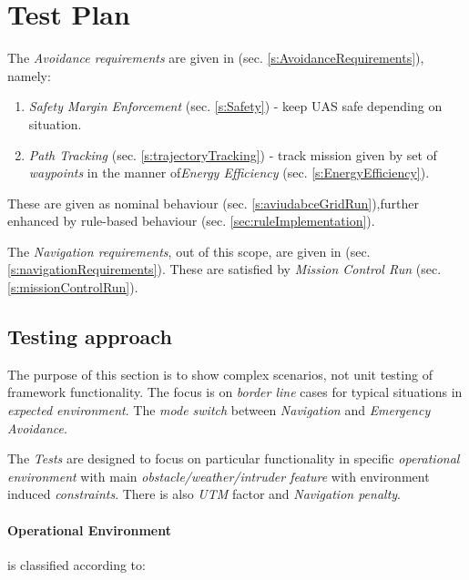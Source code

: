 \section{Test Plan} \label{s:testPlan}

\noindent The \emph{Avoidance requirements} are given in (sec. \ref{s:AvoidanceRequirements}), namely:
\begin{enumerate}
    \item\emph{Safety Margin Enforcement} (sec. \ref{s:Safety}) - keep UAS safe depending on situation.
    \item\emph{Path Tracking} (sec. \ref{s:trajectoryTracking}) - track mission given by set of \emph{waypoints} in the manner of\emph{Energy Efficiency} (sec. \ref{s:EnergyEfficiency}).
\end{enumerate}

These are given as nominal behaviour (sec. \ref{s:aviudabceGridRun}),further enhanced by rule-based behaviour (sec. \ref{sec:ruleImplementation}).

The \emph{Navigation requirements}, out of this scope, are given in (sec. \ref{s:navigationRequirements}). These are satisfied by \emph{Mission Control Run} (sec. \ref{s:missionControlRun}).


\subsection{Testing approach}\label{s:testingApproach}

\noindent The purpose of this section is to show complex scenarios, not unit testing of framework functionality. The focus is on \emph{border line} cases for typical situations in \emph{expected environment}. The \emph{mode switch} between \emph{Navigation} and \emph{Emergency Avoidance}.

The \emph{Tests} are designed to focus on particular functionality in specific \emph{operational environment} with main \emph{obstacle/weather/intruder feature} with environment induced \emph{constraints}. There is also \emph{UTM} factor and \emph{Navigation penalty}.

\paragraph{Operational Environment} is classified according to:


